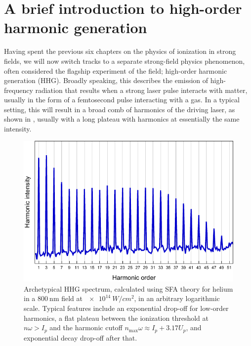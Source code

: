 





\chapter{A brief introduction to high-order harmonic generation}
\label{chap:HHG-intro}

Having spent the previous six chapters on the physics of ionization in strong fields, we will now switch tracks to a separate strong-field physics phenomenon, often considered the flagship experiment of the field; high-order harmonic generation (HHG). Broadly speaking, this describes the emission of high-frequency radiation that results when a strong laser pulse interacts with matter, usually in the form of a femtosecond pulse interacting with a gas. In a typical setting, this will result in a broad comb of harmonics of the driving laser, as shown in , usually with a long plateau with harmonics at essentially the same intensity.

\begin{figure}[htb]
  \centering
  \includegraphics[scale=1]{7-HHG-intro/Figures/figure7B.pdf}
  \caption[
  Archetypical HHG spectrum
  ]{
  Archetypical HHG spectrum, calculated using SFA theory for helium in a $\SI{800}{\nano\meter}$ field at $\SI{e14}{W/cm^2}$, in an arbitrary logarithmic scale. Typical features include an exponential drop-off for low-order harmonics, a flat plateau between the ionization threshold at $n\omega>I_p$ and the harmonic cutoff $n_\mathrm{max}\omega\approx I_p+3.17U_p$, and exponential decay drop-off after that.
  }
\label{f7-standard-harmonic-spectrum}
\end{figure}

